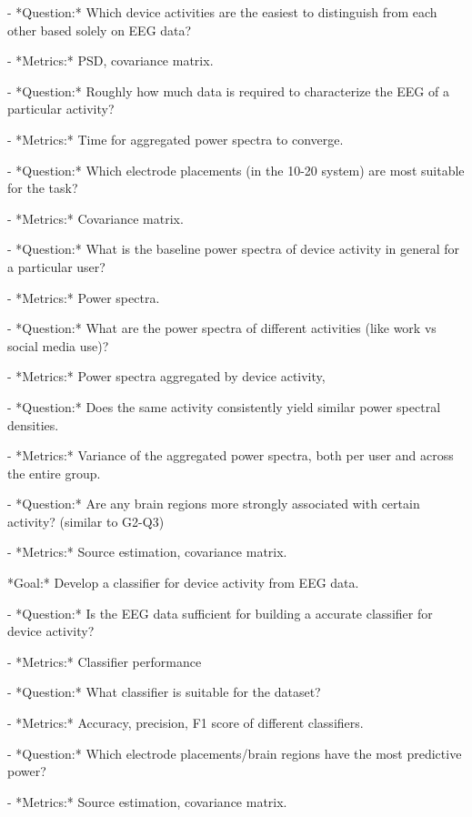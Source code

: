 \documentclass{IEEEtran}
\begin{document}
\begin{refsection}
\begin{markdown}
 - *Question:* Which device activities are the easiest to distinguish from each other based solely on EEG data?

    - *Metrics:* PSD, covariance matrix.

 - *Question:* Roughly how much data is required to characterize the EEG of a particular activity?

    - *Metrics:* Time for aggregated power spectra to converge.

 - *Question:* Which electrode placements (in the 10-20 system) are most suitable for the task?

    - *Metrics:* Covariance matrix.

 - *Question:* What is the baseline power spectra of device activity in general for a particular user?

    - *Metrics:* Power spectra.

 - *Question:* What are the power spectra of different activities (like work vs social media use)?

    - *Metrics:* Power spectra aggregated by device activity,

 - *Question:* Does the same activity consistently yield similar power spectral densities.

    - *Metrics:* Variance of the aggregated power spectra, both per user and across the entire group.

 - *Question:* Are any brain regions more strongly associated with certain activity? (similar to G2-Q3)

    - *Metrics:* Source estimation, covariance matrix.
\end{markdown}


\begin{markdown}
*Goal:* Develop a classifier for device activity from EEG data.

 - *Question:* Is the EEG data sufficient for building a accurate classifier for device activity?

    - *Metrics:* Classifier performance

 - *Question:* What classifier is suitable for the dataset?

    - *Metrics:* Accuracy, precision, F1 score of different classifiers.

 - *Question:* Which electrode placements/brain regions have the most predictive power?

    - *Metrics:* Source estimation, covariance matrix.
\end{markdown}


\end{refsection}
\end{document}
